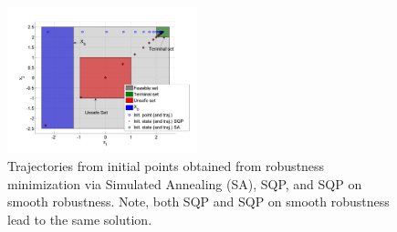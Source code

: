 \begin{figure}[t]
\centering
\includegraphics[width=0.49\textwidth]{figures/ToyExampleFalse}
\caption{Trajectories from initial points obtained from robustness minimization via Simulated Annealing (SA), SQP, and SQP on smooth robustness. Note, both SQP and SQP on smooth robustness lead to the same solution.}
\label{fig:toy falisification}
\end{figure}
